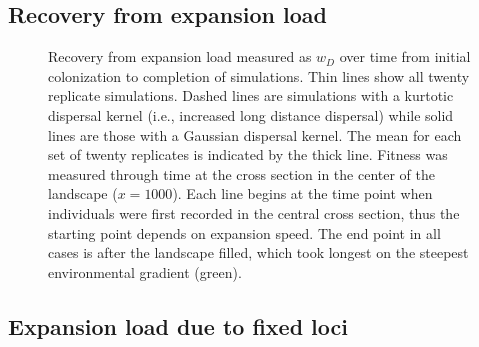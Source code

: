 \newpage{}




\subsection*{Recovery from expansion load}


\begin{figure}[h!]
\centering
{}
\caption[Recovery from expansion load.]{Recovery from expansion load measured as $w_D$ over time from initial colonization to completion of simulations. Thin lines show all twenty replicate simulations. Dashed lines are simulations with a kurtotic dispersal kernel (i.e., increased long distance dispersal) while solid lines are those with a Gaussian dispersal kernel. The mean for each set of twenty replicates is indicated by the thick line. Fitness was measured through time at the cross section in the center of the landscape ($x = 1000$). Each line begins at the time point when individuals were first recorded in the central cross section, thus the starting point depends on expansion speed. The end point in all cases is after the landscape filled, which took longest on the steepest environmental gradient (green).}
\label{fig:recovery}
\end{figure}


\newpage{}




\subsection{Expansion load due to fixed loci}



